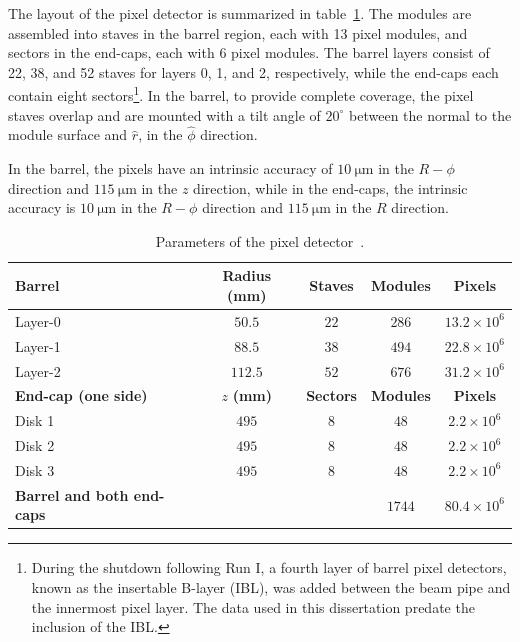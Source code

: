 The layout of the pixel detector is summarized in table~\ref{table:ATLAS-pixel-layout}.  The modules are assembled into staves in the barrel region, each with 13 pixel modules, and sectors in the end-caps, each with 6 pixel modules. The barrel layers consist of 22, 38, and 52 staves for layers 0, 1, and 2, respectively, while the end-caps each contain eight sectors\footnote{During the shutdown following Run I, a fourth layer of barrel pixel detectors, known as the insertable B-layer (IBL), was added between the beam pipe and the innermost pixel layer. The data used in this dissertation predate the inclusion of the IBL.}. In the barrel, to provide complete coverage, the pixel staves overlap and are mounted with a tilt angle of $20^{\circ}$ between the normal to the module surface and $\hat{r}$, in the $\hat{\phi}$ direction. 

In the barrel, the pixels have an intrinsic accuracy of $\SI{10}{\micro\meter}$ in the $R-\phi$ direction and $\SI{115}{\micro\meter}$ in the $z$ direction, while in the end-caps, the intrinsic accuracy is $\SI{10}{\micro\meter}$ in the $R-\phi$ direction and $\SI{115}{\micro\meter}$ in the $R$ direction. 

\begin{table}[htbp]
	\centering
	\begin{tabular}{|l|c|c|c|c|}
		\hline
		\textbf{Barrel} & \textbf{Radius (mm)} & \textbf{Staves} & \textbf{Modules} & \textbf{Pixels} \\
		\hline
		Layer-0 & $50.5$ & $22$ & $286$ & $13.2\times 10^6$ \\
		Layer-1 & $88.5$ & $38$ & $494$ & $22.8\times 10^6$ \\
		Layer-2 & $112.5$ & $52$ & $676$ & $31.2\times 10^6$ \\
		\hline
		\textbf{End-cap (one side)} & $z$ \textbf{(mm)} & \textbf{Sectors} & \textbf{Modules} & \textbf{Pixels} \\
		\hline
		Disk 1 & $495$ & $8$ & $48$ & $2.2\times 10^6$ \\
		Disk 2 & $495$ & $8$ & $48$ & $2.2\times 10^6$ \\
		Disk 3 & $495$ & $8$ & $48$ & $2.2\times 10^6$ \\
		\hline
		\textbf{Barrel and both end-caps} & & & $1744$ & $80.4\times 10^6$ \\
		\hline
	\end{tabular}
	\caption[Parameters of the pixel detector.]{Parameters of the pixel detector~\cite{TheATLASCollaboration:2008fg}.}
	\label{table:ATLAS-pixel-layout}
\end{table}


